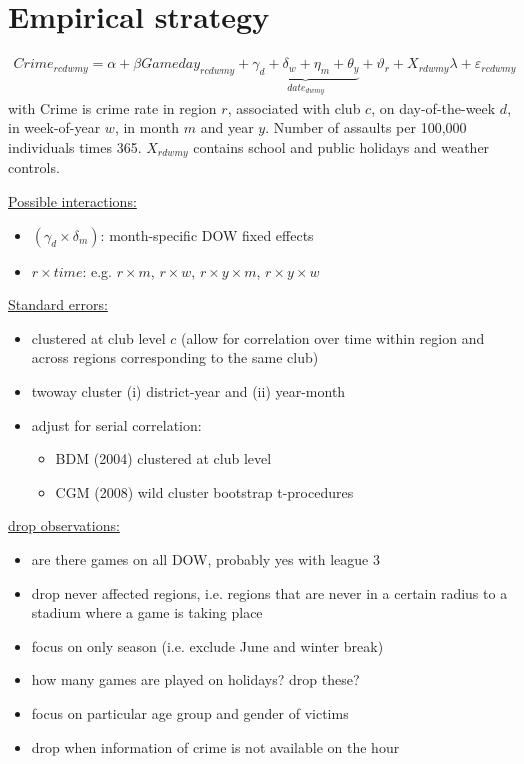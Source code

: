 \documentclass[11pt, a4paper]{article} %
\begin{document}
\newpage
\section{Empirical strategy}\label{sec_soc_ext:empirical_strategy}




\begin{align}
	Crime_{rcdwmy} = \alpha + \beta Gameday_{rcdwmy} + \underbrace{\gamma_d + \delta_w +  \eta_m + \theta_y}_{date_{dwmy}} + \vartheta_r + X_{rdwmy} \lambda + \varepsilon_{rcdwmy}
	\label{eq_soc_ext:model}
\end{align}
with Crime is crime rate in region $r$, associated with club $c$, on day-of-the-week $d$, in week-of-year $w$, in month $m$ and year $y$. Number of assaults per 100,000 individuals times 365. $X_{rdwmy}$ contains school and public holidays and weather controls.\newline

\underline{Possible interactions:} 
\begin{itemize}
	\item $(\gamma_d \times \delta_m)$: month-specific DOW fixed effects
	\item $r \times time$: e.g. $r \times m$, $r \times w$, $r \times y \times m$,  $r \times y \times w$
\end{itemize}

\underline{Standard errors:}
\begin{itemize}
	\item clustered at club level $c$ (allow for correlation over time within region and across regions corresponding to the same club)
	\item twoway cluster (i) district-year and (ii) year-month
	\item adjust for serial correlation: 
	\begin{itemize}
		\item BDM (2004) clustered at club level
		\item CGM (2008) wild cluster bootstrap t-procedures
	\end{itemize}
\end{itemize}

\underline{drop observations:}
\begin{itemize}
	\item are there games on all DOW, probably yes with league 3
	\item drop never affected regions, i.e. regions that are never in a certain radius to a stadium where a game is taking place
	\item focus on only season (i.e. exclude June and winter break)
	\item how many games are played on holidays? drop these? 
	\item focus on particular age group and gender of victims
	\item drop when information of crime is not available on the hour
\end{itemize}
\end{document}
